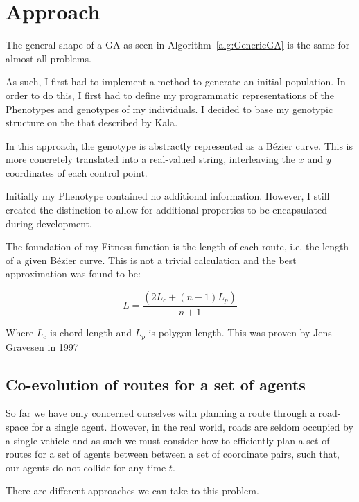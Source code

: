 
\section{Approach}

The general shape of a GA as seen in Algorithm~\ref{alg:GenericGA} is the same for almost all problems. 

As such, I first had to implement a method to generate an initial population. In order to do this, I first had to define my programmatic representations of the Phenotypes and genotypes of my individuals. I decided to base my genotypic structure on the that described by Kala\cite{kalaOnroadIntelligentVehicles2016}. 

In this approach, the genotype is abstractly represented as a Bézier curve. This is more concretely translated into a real-valued string, interleaving the $x$ and $y$ coordinates of each control point.

Initially my Phenotype contained no additional information. However, I still created the distinction to allow for additional properties to be encapsulated during development.

 The foundation of my Fitness function is the length of each route, i.e. the length of a given Bézier curve. This is not a trivial calculation and the best approximation was found to be:

\begin{equation}
    L = \frac{(2L_c + (n-1)L_p)}{n+1}
\end{equation}

Where $L_c$ is chord length and $L_p$ is polygon length. This was proven by Jens Gravesen\cite{gravesenAdaptiveSubdivisionLength1997} in 1997

\subsection{Co-evolution of routes for a set of agents}

So far we have only concerned ourselves with planning a route through a road-space for a single agent. However, in the real world, roads are seldom occupied by a single vehicle and as such we must consider how to efficiently plan a set of routes for a set of agents between between a set of coordinate pairs, such that, our agents do not collide for any time $t$.

There are different approaches we can take to this problem. 

